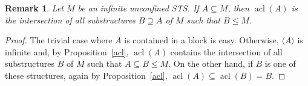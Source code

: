 \documentclass[a4paper, 11pt]{article}
\DeclareMathOperator{\acl}{acl}
\theoremstyle{note}
\newtheorem{rmk}[thm]{Remark}
\begin{document}
	\begin{rmk}
		Let $M$ be an infinite unconfined STS. If $A\subseteq M$, then $\acl(A)$ is the intersection of all substructures $B\supseteq A$ of $M$ such that $B\leq M$.
	\end{rmk}
	\begin{proof} The trivial case where  $A$ is contained in a block is easy. Otherwise, $\langle A\rangle$ is infinite and, by Proposition~\ref{acl}, $\acl(A)$ contains the intersection of all substructures $B$ of $M$  such that $A\subseteq B\leq M$. On the other hand, if $B$ is one of these structures, again by Proposition~\ref{acl}, $\acl(A)\subseteq \acl(B) =B$.


		\end{proof}
	
\end{document}
